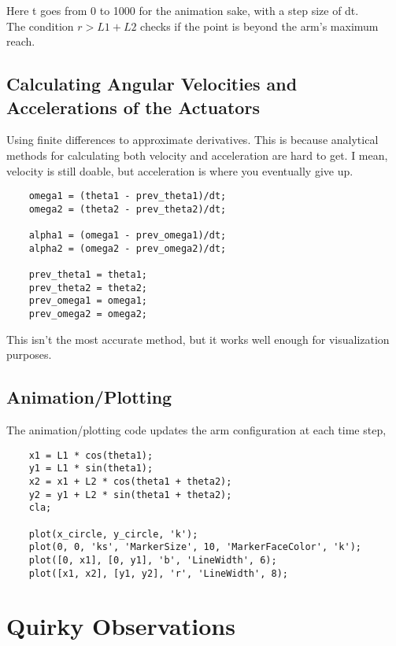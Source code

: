 \documentclass{article}
\begin{document}
Here t goes from 0 to 1000 for the animation sake, with a step size of dt.\\
The condition $r > L1 + L2$ checks if the point is beyond the arm's maximum reach.

\subsection*{Calculating Angular Velocities and Accelerations of the Actuators}
Using finite differences to approximate derivatives. This is because analytical methods for calculating both velocity and acceleration are hard to get. I mean, velocity is still doable, but acceleration is where you eventually give up.

\begin{lstlisting}[style=Matlab-editor]
    % Finding angular velocity and acceleration
    omega1 = (theta1 - prev_theta1)/dt;
    omega2 = (theta2 - prev_theta2)/dt;

    alpha1 = (omega1 - prev_omega1)/dt;
    alpha2 = (omega2 - prev_omega2)/dt;

    prev_theta1 = theta1;
    prev_theta2 = theta2;
    prev_omega1 = omega1;
    prev_omega2 = omega2;
\end{lstlisting}

This isn't the most accurate method, but it works well enough for visualization purposes.

\subsection*{Animation/Plotting}
The animation/plotting code updates the arm configuration at each time step,

\begin{lstlisting}[style=Matlab-editor]
    % Plotting the arm and circle
    x1 = L1 * cos(theta1);
    y1 = L1 * sin(theta1);
    x2 = x1 + L2 * cos(theta1 + theta2);
    y2 = y1 + L2 * sin(theta1 + theta2);
    cla;
   
    plot(x_circle, y_circle, 'k');
    plot(0, 0, 'ks', 'MarkerSize', 10, 'MarkerFaceColor', 'k');
    plot([0, x1], [0, y1], 'b', 'LineWidth', 6);
    plot([x1, x2], [y1, y2], 'r', 'LineWidth', 8);
\end{lstlisting}

\section*{Quirky Observations}
\end{document}
